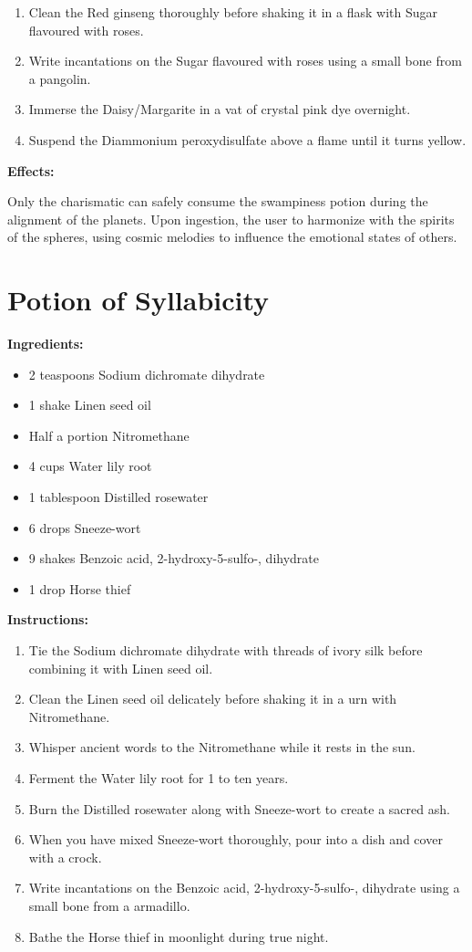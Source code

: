 \documentclass{article}
\begin{document}
\begin{enumerate}
  \item Clean the Red ginseng thoroughly before shaking it in a flask with Sugar flavoured with roses.
  \item Write incantations on the Sugar flavoured with roses using a small bone from a pangolin.
  \item Immerse the Daisy/Margarite in a vat of crystal pink dye overnight.
  \item Suspend the Diammonium peroxydisulfate above a flame until it turns yellow.
\end{enumerate}

\textbf{Effects:}

Only the charismatic can safely consume the swampiness potion during the alignment of the planets. Upon ingestion, the user to harmonize with the spirits of the spheres, using cosmic melodies to influence the emotional states of others.

\newpage
\section*{Potion of Syllabicity}

\textbf{Ingredients:}

\begin{itemize}
  \item 2 teaspoons Sodium dichromate dihydrate
  \item 1 shake Linen seed oil
  \item Half a portion Nitromethane
  \item 4 cups Water lily root
  \item 1 tablespoon Distilled rosewater
  \item 6 drops Sneeze-wort
  \item 9 shakes Benzoic acid, 2-hydroxy-5-sulfo-, dihydrate
  \item 1 drop Horse thief
\end{itemize}

\textbf{Instructions:}

\begin{enumerate}
  \item Tie the Sodium dichromate dihydrate with threads of ivory silk before combining it with Linen seed oil.
  \item Clean the Linen seed oil delicately before shaking it in a urn with Nitromethane.
  \item Whisper ancient words to the Nitromethane while it rests in the sun.
  \item Ferment the Water lily root for 1 to ten years.
  \item Burn the Distilled rosewater along with Sneeze-wort to create a sacred ash.
  \item When you have mixed Sneeze-wort thoroughly, pour into a dish and cover with a crock.
  \item Write incantations on the Benzoic acid, 2-hydroxy-5-sulfo-, dihydrate using a small bone from a armadillo.
  \item Bathe the Horse thief in moonlight during true night.
\end{enumerate}
\end{document}
